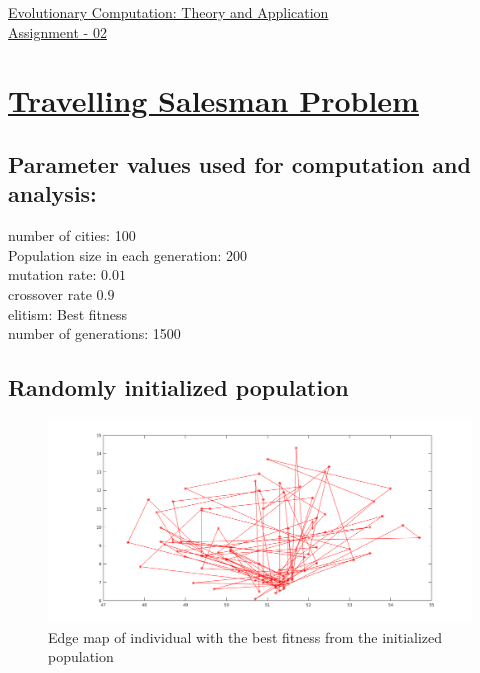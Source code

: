 \documentclass[14pt,a4paper,openright,twoside]{extreport}
\begin{document}
\begin{center}
\LARGE{\underline{Evolutionary Computation: Theory and Application}}\\
\LARGE{\underline{Assignment - 02}}
\section*{\underline{Travelling Salesman Problem}}
\end{center}

\subsection*{\textbf{Parameter values used for computation and analysis:}}
number of cities: 100 \\
Population size in each generation: 200  \\
mutation rate: $ 0.01$ \\
crossover rate $ 0.9$ \\
elitism: Best fitness \\
number of generations: 1500 \\

\subsection*{\textbf{Randomly initialized population}}
\begin{figure}[H]
    \begin{center}
        \includegraphics[width=\textwidth]{tspmap_randomcross_neighbormutate_1500_before.png}
        \caption{\small{Edge map of individual with the best fitness from the initialized population}}
        \label{mapinitalize1500}
    \end{center}
\end{figure}
\end{document}
